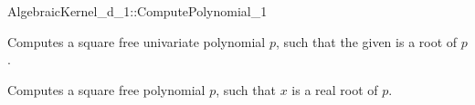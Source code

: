 \begin{ccRefFunctionObjectConcept}{AlgebraicKernel_d_1::ComputePolynomial_1}

\ccDefinition
Computes a square free univariate polynomial $p$, such that the given 
 is a root of $p$. 

\ccRefines 
{}  
 
\ccTypes
\ccGlue
{}

\ccOperations
{}

{Computes a square free polynomial $p$, such that $x$ is a real root of $p$.}


\ccSeeAlso
{}\\

\end{ccRefFunctionObjectConcept}
